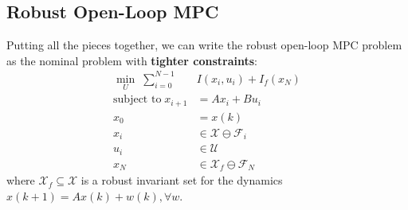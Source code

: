 
\subsection{Robust Open-Loop MPC}\label{robust_OL_MPC}
Putting all the pieces together, we can write the robust open-loop MPC problem as the nominal problem with \textbf{tighter constraints}:
\begin{align*}
    \min_{U}\;          \sum_{i=0}^{N-1} & I(x_i,u_i)+I_f(x_N)                      \\
    \text{subject to}\; x_{i+1}          & =Ax_{i}+Bu_{i}                           \\
    x_0                                  & =x(k)                                    \\
    x_i                                  & \in\mathcal{X} \ominus \mathcal{F}_i     \\
    u_{i}                                & \in\mathcal{U}                           \\
    x_N                                  & \in\mathcal{X}_{f} \ominus \mathcal{F}_N
\end{align*}
where $\mathcal{X}_f \subseteq \mathcal{X}$ is a robust invariant set for the dynamics $x(k+1) = Ax(k) + w(k) , \forall w$.
\newpar{}

